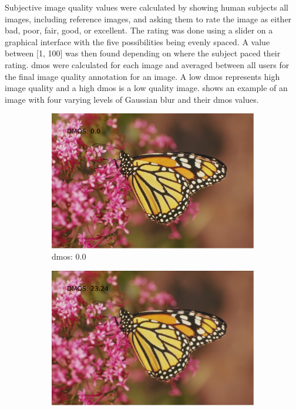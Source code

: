 Subjective image quality values were calculated by showing human subjects all images, including reference images, and asking them to rate the image as either bad, poor, fair, good, or excellent. The rating was done using a slider on a graphical interface with the five possibilities being evenly spaced. A value between [1, 100] was then found depending on where the subject paced their rating. \gls{dmos} were calculated for each image and averaged between all users for the final image quality annotation for an image. A low \gls{dmos} represents high image quality and a high \gls{dmos} is a low quality image.  shows an example of an image with four varying levels of Gaussian blur and their \gls{dmos} values.

\begin{figure}[H]
    \centering
    \begin{subfigure}[b]{0.4\textwidth}
        \center
        \includegraphics[width=\textwidth]{Figs/Implementation/img173.pdf}
        \caption{\gls{dmos}: 0.0}\label{fig:}
    \end{subfigure}
    \begin{subfigure}[b]{0.4\textwidth}
        \center
        \includegraphics[width=\textwidth]{Figs/Implementation/img96.pdf}

\end{subfigure}
\end{figure}
